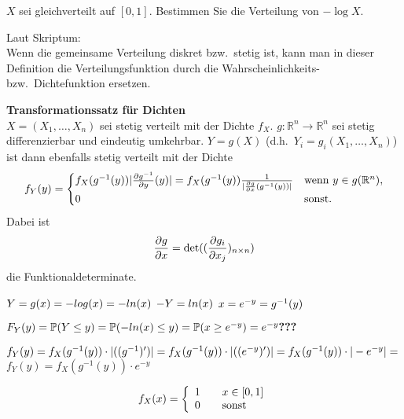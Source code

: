 \begin{uebsp}
\begin{Exercise}[label=ex:2.5]
$X$ sei gleichverteilt auf $[0, 1]$. Bestimmen Sie die Verteilung von $-\log X$.
\end{Exercise}
\begin{Answer}

Laut Skriptum:\\
Wenn die gemeinsame Verteilung diskret bzw.\ stetig ist, kann man
in dieser Definition die Verteilungsfunktion durch die Wahrscheinlichkeits-
bzw.\ Dichtefunktion ersetzen. 

\begin{uebsp_theory}
    \textbf{Transformationssatz für Dichten}\\
$X=(X_1,\dots,X_n)$ sei stetig verteilt mit der Dichte $f_X$.
$g:\mathbb R^n\to\mathbb R^n$ sei stetig differenzierbar und 
eindeutig umkehrbar. $Y=g(X)$ (d.h.\ $Y_i=g_i(X_1,\dots, X_n)$)
ist dann ebenfalls stetig verteilt mit der Dichte
\[f_Y(y)=\begin{cases}f_X(g^{-1}(y))|{\partial g^{-1}\over\partial y}(y)|=f_X(g^{-1}(y)){1\over |{\partial g\over\partial x}(g^{-1}(y))|} &\mbox{wenn } y \in g(\mathbb{R}^n), \\
0 & \mbox{sonst.}\end{cases}\]
Dabei ist
\[{\partial g\over\partial x}=\det( ({\partial g_i\over\partial x_j})_{n\times
n})\]
die Funktionaldeterminate.
\end{uebsp_theory}

$Y = g(x) = -log(x)  = -ln(x)\\$
$-Y = ln(x)\\$
$x=e^{-y}=g^{-1}(y)\\$

$F_{Y}(y)=\mathbb{P}(Y \le y)=\mathbb{P}(-ln(x) \le y)=\mathbb{P}(x \ge e^{-y})=e^{-y} \textbf{???}\\\\$

$f_Y(y)=f_X(g^{-1}(y)) \cdot \vert((g^{-1})')\vert=f_X(g^{-1}(y)) \cdot \vert((e^{-y})')\vert=f_X(g^{-1}(y)) \cdot \vert-e^{-y}\vert=\\$
$f_Y(y)=f_X(g^{-1}(y)) \cdot e^{-y}$


\[ f_X(x) = \left\{
  \begin{array}{l l}
    1 & \quad \text{$x \in [0,1]$}\\
    0 & \quad \text{sonst} \\
\end{array} \right.\]


\end{Answer}
\end{uebsp}
